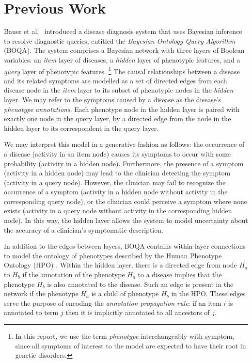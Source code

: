 \section{Previous Work}
\label{sec:lit-rev}

Bauer et al.\ \cite{bauer2012bayesian} introduced a disease diagnosis system
that uses Bayesian inference to resolve diagnostic queries, entitled the 
{\it Bayesian Ontology Query Algorithm} (BOQA).
%
The system comprises a Bayesian network with three layers of Boolean variables:
an {\it item} layer of diseases, a {\it hidden} layer of phenotypic features,
and a {\it query} layer of phenotypic features.
%
\footnote{
    In this report, we use the term {\it phenotype} interchangeably with symptom,
    since all symptoms of interest to the model are expected to have their root
    in genetic disorders.
}
%
The causal relationships between a disease and its related symptoms are modelled
as a set of directed edges from each disease node in the {\it item} layer to its
subset of phenotypic nodes in the {\it hidden} layer.
%
We may refer to the symptoms caused by a disease as the disease's {\it phenotype
annotations}.
%
Each phenotype node in the hidden layer is paired with exactly one node in the
query layer, by a directed edge from the node in the hidden layer to its
correspondent in the query layer.

We may interpret this model in a generative fashion as follows:
%
the occurrence of a disease (activity in an item node) causes its symptoms to
occur with some probability (activity in a hidden node). Furthermore, the
presence of a symptom (activity in a hidden node) may lead to the clinician
detecting the symptom (activity in a query node). However, the clinician may
fail to recognize the occurrence of a symptom (activity in a hidden node without
activity in the corresponding query node), or the clinician could perceive a
symptom where none exists (activity in a query node without
activity in the corresponding hidden node).
%
In this way, the hidden layer allows the system to model uncertainty about the
accuracy of a clinician's symptomatic description.

In addition to the edges between layers, BOQA contains within-layer connections
to model the ontology of phenotypes described by the Human Phenotype Ontology
(HPO) \cite{kohler2014hpo}.
%
Within the hidden layer, there is a directed edge from node $H_a$ to $H_b$
if the annotation of the phenotype $H_a$ to a disease implies that the phenotype
$H_b$ is also annotated to the disease.
%
Such an edge is present in the network if the phenotype $H_a$ is a child of
phenotype $H_b$ in the HPO. 
%
These edges serve the purpose of encoding the {\it annotation propagation rule}:
if an item $i$ is annotated to term $j$ then it is implicitly annotated to all
ancestors of $j$.

